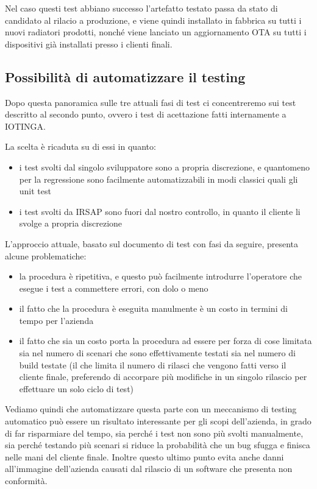 \documentclass[a4paper,titlepage]{article}
\begin{document}
Nel caso questi test abbiano successo l'artefatto testato passa da stato di candidato
al rilacio a produzione, e viene quindi installato in fabbrica su tutti i nuovi radiatori
prodotti, nonché viene lanciato un aggiornamento OTA su tutti i dispositivi già installati
presso i clienti finali.

\subsection{Possibilità di automatizzare il testing}

Dopo questa panoramica sulle tre attuali fasi di test ci concentreremo sui test
descritto al secondo punto, ovvero i test di acettazione fatti internamente a IOTINGA.

La scelta è ricaduta su di essi in quanto:
\begin{itemize}
    \item i test svolti dal singolo sviluppatore sono a propria discrezione, e quantomeno
        per la regressione sono facilmente automatizzabili in modi classici quali gli unit test
    \item i test svolti da IRSAP sono fuori dal nostro controllo, in quanto il cliente
        li svolge a propria discrezione
\end{itemize}

L'approccio attuale, basato sul documento di test con fasi da seguire, presenta
alcune problematiche:
\begin{itemize}
    \item la procedura è ripetitiva, e questo può facilmente introdurre
        l'operatore che esegue i test a commettere errori, con dolo o meno
    \item il fatto che la procedura è eseguita manulmente è un costo in termini di
        tempo per l'azienda
    \item il fatto che sia un costo porta la procedura ad essere per forza di cose
        limitata sia nel numero di scenari che sono effettivamente testati sia nel
        numero di build testate (il che limita il numero di rilasci che vengono
        fatti verso il cliente finale, preferendo di accorpare più modifiche in un
        singolo rilascio per effettuare un solo ciclo di test)
\end{itemize}

Vediamo quindi che automatizzare questa parte con un meccanismo di testing automatico
può essere un risultato interessante per gli scopi dell'azienda, in grado di far
risparmiare del tempo, sia perché i test non sono più svolti manualmente, sia perché
testando più scenari si riduce la probabilità che un bug sfugga e finisca nelle mani
del cliente finale. Inoltre questo ultimo punto evita anche danni all'immagine dell'azienda
causati dal rilascio di un software che presenta non conformità.
\end{document}

